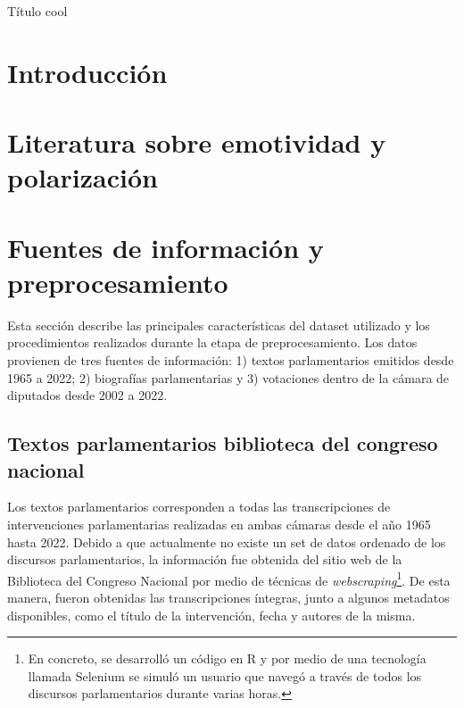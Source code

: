 \documentclass[
  12pt,
]{article}
\author{}
\date{\vspace{-2.5em}}
\begin{document}
Título cool

\newpage

\newpage
\begin{spacing}{0.9} 
\tableofcontents
\end{spacing}

\newpage

\begin{spacing}{0.9} 
\listoftables
\end{spacing}

\newpage
\listoffigures
\newpage
\normalsize

\hypertarget{introducciuxf3n}{%
\section{Introducción}\label{introducciuxf3n}}

\pagebreak

\hypertarget{literatura-sobre-emotividad-y-polarizaciuxf3n}{%
\section{Literatura sobre emotividad y
polarización}\label{literatura-sobre-emotividad-y-polarizaciuxf3n}}

\pagebreak

\hypertarget{fuentes-de-informaciuxf3n-y-preprocesamiento}{%
\section{Fuentes de información y
preprocesamiento}\label{fuentes-de-informaciuxf3n-y-preprocesamiento}}

Esta sección describe las principales características del dataset
utilizado y los procedimientos realizados durante la etapa de
preprocesamiento. Los datos provienen de tres fuentes de información: 1)
textos parlamentarios emitidos desde 1965 a 2022; 2) biografías
parlamentarias y 3) votaciones dentro de la cámara de diputados desde
2002 a 2022.

\hypertarget{textos-parlamentarios-biblioteca-del-congreso-nacional}{%
\subsection{Textos parlamentarios biblioteca del congreso
nacional}\label{textos-parlamentarios-biblioteca-del-congreso-nacional}}

Los textos parlamentarios corresponden a todas las transcripciones de
intervenciones parlamentarias realizadas en ambas cámaras desde el año
1965 hasta 2022. Debido a que actualmente no existe un set de datos
ordenado de los discursos parlamentarios, la información fue obtenida
del sitio web de la Biblioteca del Congreso Nacional por medio de
técnicas de
\emph{webscraping}\footnote{En concreto, se desarrolló un código en R y por medio de una tecnología llamada Selenium se simuló un usuario que navegó a través de todos los discursos parlamentarios durante varias horas.}.
De esta manera, fueron obtenidas las transcripciones íntegras, junto a
algunos metadatos disponibles, como el título de la intervención, fecha
y autores de la misma.
\end{document}

